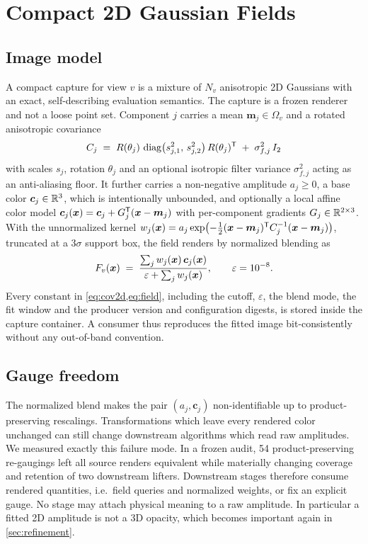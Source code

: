 \section{Compact 2D Gaussian Fields}
\label{sec:fields}

\subsection{Image model}
\label{sec:field-model}

A compact capture for view $v$ is a mixture of $N_v$ anisotropic 2D Gaussians with an
exact, self-describing evaluation semantics.  The capture is a frozen renderer and not a
loose point set.  Component $j$ carries a mean $\bm{m}_j \in \Omega_v$ and a rotated
anisotropic covariance
\begin{equation}
  C_j \;=\; R(\theta_j)\,\operatorname{diag}\!\big(s_{j,1}^2,\, s_{j,2}^2\big)\,R(\theta_j)^{\mathsf{T}}
  \;+\; \sigma_{f,j}^2\, I_2
  \label{eq:cov2d}
\end{equation}
with scales $s_j$, rotation $\theta_j$ and an optional isotropic filter variance
$\sigma_{f,j}^2$ acting as an anti-aliasing floor.  It further carries a non-negative
amplitude $a_j \ge 0$, a base color $\bm{c}_j \in \mathbb{R}^3$, which is intentionally unbounded,
and optionally a local affine color model
$\bm{c}_j(\bm{x}) = \bm{c}_j + G_j^{\mathsf{T}}(\bm{x} - \bm{m}_j)$ with per-component gradients
$G_j \in \mathbb{R}^{2\times 3}$.  With the unnormalized kernel
$w_j(\bm{x}) = a_j \exp\!\big({-\tfrac12 (\bm{x}-\bm{m}_j)^{\mathsf{T}} C_j^{-1} (\bm{x}-\bm{m}_j)}\big)$,
truncated at a $3\sigma$ support box, the field renders by normalized blending as
\begin{equation}
  F_v(\bm{x})
  \;=\;
  \frac{\sum_j w_j(\bm{x})\, \bm{c}_j(\bm{x})}
       {\varepsilon + \sum_j w_j(\bm{x})},
  \qquad \varepsilon = 10^{-8}.
  \label{eq:field}
\end{equation}
Every constant in \cref{eq:cov2d,eq:field}, including the cutoff, $\varepsilon$, the blend
mode, the fit window and the producer version and configuration digests, is stored inside
the capture container.  A consumer thus reproduces the fitted image bit-consistently
without any out-of-band convention.

\subsection{Gauge freedom}
\label{sec:gauge}

The normalized blend makes the pair $(a_j, \bm{c}_j)$ non-identifiable up to
product-preserving rescalings.  Transformations which leave every rendered color unchanged
can still change downstream algorithms which read raw amplitudes.  We measured exactly
this failure mode.  In a frozen audit, 54 product-preserving re-gaugings left all source
renders equivalent while materially changing coverage and retention of two downstream
lifters.  Downstream stages therefore consume rendered
quantities, i.e.\ field queries and normalized weights, or fix an explicit gauge.  No
stage may attach physical meaning to a raw amplitude.  In particular a fitted 2D amplitude
is not a 3D opacity, which becomes important again in \cref{sec:refinement}.

